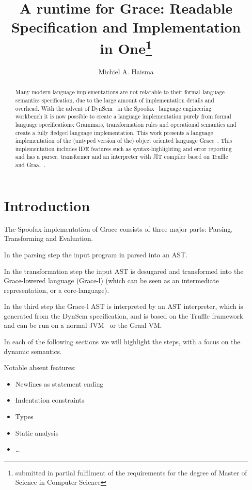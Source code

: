 \documentclass[a4paper,UKenglish]{lipics-v2016}
\title{A runtime for Grace: Readable Specification and Implementation in One\footnote{submitted in partial fulfilment of the requirements for the degree of Master of Science in Computer Science}}
\author[1]{Michiel A. Haisma}
\affil[1]{Delft University of Technology, Mekelweg 6/Delft, The Netherlands\\
  \texttt{m.a.haisma@student.tudelft.nl}}
\begin{document}
\maketitle

\begin{abstract}
Many modern language implementations are not relatable to their formal language semantics specification, due to the large amount of implementation details and overhead. With the advent of DynSem~\cite{vergu2015dynsem} in the Spoofax~\cite{Kats:2010:SLW:1869459.1869497} language engineering workbench it is now possible to create a language implementation purely from formal language specifications: Grammars, transformation rules and operational semantics and create a fully fledged language implementation. This work presents a language implementation of the (untyped version of the) object oriented language Grace~\cite{Black:2012:GAD:2384592.2384601, gracelang}. This implementation includes IDE features such as syntax-highlighting and error reporting and has a parser, transformer and an interpreter with JIT compiler based on Truffle~\cite{Wimmer:2012:TSR:2384716.2384723,Wurthinger:2012:SAI:2384577.2384587} and Graal~\cite{Wurthinger:2013:OVR:2509578.2509581}.
\end{abstract}

\section{Introduction}
The Spoofax implementation of Grace consists of three major parts: Parsing, Transforming and Evaluation.

In the parsing step the input program in parsed into an AST.

In the transformation step the input AST is desugared and transformed into the Grace-lowered language (Grace-l) (which can be seen as an intermediate representation, or a core-language). 

In the third step the Grace-l AST is interpreted by an AST interpreter, which is generated from the DynSem specification, and is based on the Truffle framework and can be run on a normal JVM~\cite{jvm} or the Graal VM.

In each of the following sections we will highlight the steps, with a focus on the dynamic semantics.

Notable absent features:
\begin{itemize}
	\item Newlines as statement ending
	\item Indentation constraints
	\item Types
	\item Static analysis
	\item \dots
\end{itemize}
\end{document}

